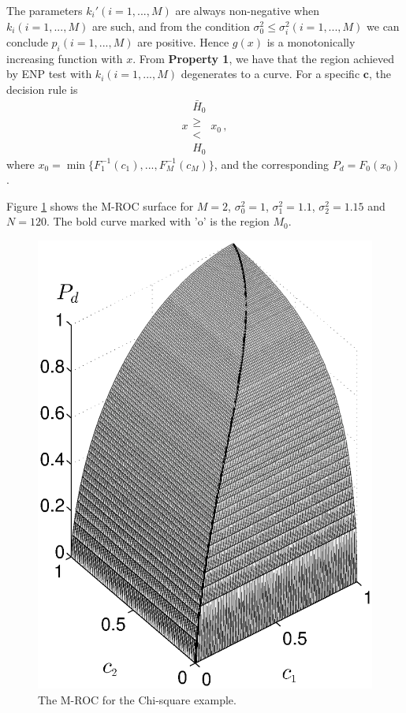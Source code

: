 The parameters $k_i' (i=1, ..., M)$ are always non-negative when $k_i (i=1, ..., M)$ are such, and from 
 the condition $\sigma_0^2 \leq \sigma_i^2 (i=1, ..., M)$ we can conclude $p_i (i=1, ..., M)$ are positive. Hence $g(x)$ is a monotonically increasing function with $x$. From \textbf{Property 1}, we have that the region achieved by ENP test with $k_i (i = 1, ..., M)$ degenerates to a curve. For a specific $\mathbf{c}$, the decision rule is
\begin{equation}
  \label{equ: decision rule chi 2}
  x \substack{\bar{H}_0 \\ \geq \\ < \\ H_0} x_0\,,
\end{equation}
where $x_0 = \min\{F_1^{-1}(c_1), ..., F_M^{-1}(c_M)\}$,
and the corresponding $P_d = F_0(x_0)$. 

Figure \ref{pic: LJS for chisquare} shows the M-ROC surface for $M=2$, $\sigma_0^2 = 1$, $\sigma_1^2 = 1.1$, $\sigma_2^2 = 1.15$ and $N=120$. The bold curve marked with 'o' is the region $M_0$. 

\begin{figure}[!t]
\centering
\includegraphics[width=12cm]{3/simu_chi2ROC.eps}
\caption{The M-ROC for the Chi-square example.}
\label{pic: LJS for chisquare}
\end{figure}
